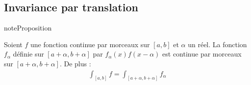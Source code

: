 \documentclass[letterpaper,10pt,french]{jupyterBook}
\begin{document}
\subsection{Invariance par translation}
\label{\detokenize{pptint:invariance-par-translation}}
\begin{sphinxadmonition}{note}{Proposition}

\sphinxAtStartPar
Soient \(f\) une fonction continue par morceaux sur \([a, b]\) et \(\alpha\) un réel.
La fonction \(f_\alpha\) définie sur \([a+\alpha, b+\alpha]\) par \(f_\alpha(x)f(x-\alpha)\) est continue par morceaux sur \([a+\alpha, b+\alpha]\). De plus :
\begin{equation*}
\begin{split}
\int_{[a, b]}f= \int_{[a+\alpha, b+\alpha]} f_{\alpha}
\end{split}
\end{equation*}\end{sphinxadmonition}
\end{document}
